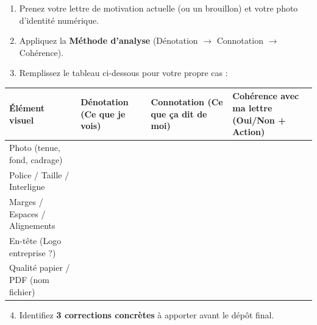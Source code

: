 \documentclass[11pt]{article}
\begin{document}
\begin{exercice}
\begin{enumerate}
    \item Prenez votre lettre de motivation actuelle (ou un brouillon) et votre photo d'identité numérique.
    \item Appliquez la \textbf{Méthode d'analyse} (Dénotation $\rightarrow$ Connotation $\rightarrow$ Cohérence).
    \item Remplissez le tableau ci-dessous pour votre propre cas :
\end{enumerate}
\begin{center}
\begin{tabularx}{\linewidth}{|l|X|X|X|}
\hline
\rowcolor{popblueL} \textbf{Élément visuel} & \textbf{Dénotation (Ce que je vois)} & \textbf{Connotation (Ce que ça dit de moi)} & \textbf{Cohérence avec ma lettre (Oui/Non + Action)} \\ \hline
Photo (tenue, fond, cadrage) & & & \\ \hline
Police / Taille / Interligne & & & \\ \hline
Marges / Espaces / Alignements & & & \\ \hline
En-tête (Logo entreprise ?) & & & \\ \hline
Qualité papier / PDF (nom fichier) & & & \\ \hline
\end{tabularx}
\end{center}
\begin{enumerate}
    \setcounter{enumi}{3}
    \item Identifiez \textbf{3 corrections concrètes} à apporter avant le dépôt final.
\end{enumerate}
\end{exercice}
\end{document}
